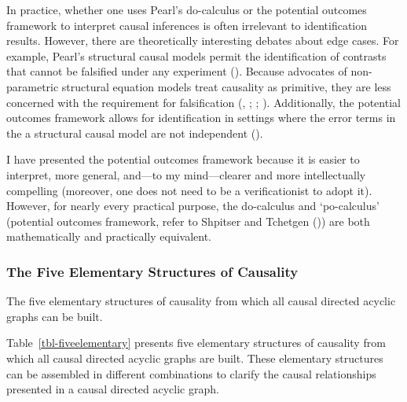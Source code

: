 \documentclass[
  single column]{article}
\begin{document}
In practice, whether one uses Pearl's do-calculus or the potential
outcomes framework to interpret causal inferences is often irrelevant to
identification results. However, there are theoretically interesting
debates about edge cases. For example, Pearl's structural causal models
permit the identification of contrasts that cannot be falsified under
any experiment (). Because advocates of non-parametric structural equation models
treat causality as primitive, they are less concerned with the
requirement for falsification (, ;
;
).
Additionally, the potential outcomes framework allows for identification
in settings where the error terms in the a structural causal model are
not independent ().

I have presented the potential outcomes framework because it is easier
to interpret, more general, and---to my mind---clearer and more
intellectually compelling (moreover, one does not need to be a
verificationist to adopt it). However, for nearly every practical
purpose, the do-calculus and `po-calculus' (potential outcomes
framework, refer to Shpitser and Tchetgen
()) are both mathematically and
practically equivalent.

\subsubsection{The Five Elementary Structures of
Causality}\label{the-five-elementary-structures-of-causality}

\begin{table}

\caption{\label{tbl-fiveelementary}The five elementary structures of
causality from which all causal directed acyclic graphs can be built.}

\centering{

\terminologydirectedgraph

}

\end{table}%

Table~\ref{tbl-fiveelementary} presents five elementary structures of
causality from which all causal directed acyclic graphs are built. These
elementary structures can be assembled in different combinations to
clarify the causal relationships presented in a causal directed acyclic
graph.
\end{document}
